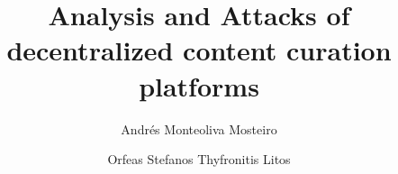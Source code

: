 \title{Analysis and Attacks of decentralized content curation platforms}
\author{Andr\'es Monteoliva Mosteiro \and Orfeas Stefanos Thyfronitis Litos}
\maketitle
